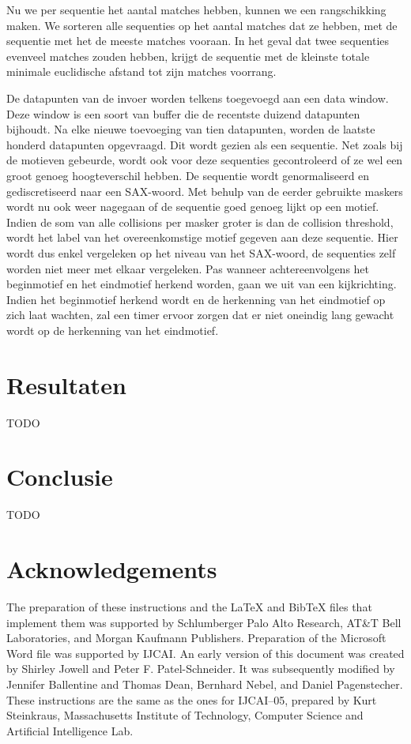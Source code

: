 \documentclass{article}
\begin{document}
Nu we per sequentie het aantal matches hebben, kunnen we een rangschikking maken. We sorteren alle sequenties op het aantal matches dat ze hebben, met de sequentie met het de meeste matches vooraan. In het geval dat twee sequenties evenveel matches zouden hebben, krijgt de sequentie met de kleinste totale minimale euclidische afstand tot zijn matches voorrang.

De datapunten van de invoer worden telkens toegevoegd aan een data window. Deze window is een soort van buffer die de recentste duizend datapunten bijhoudt. Na elke nieuwe toevoeging van tien datapunten, worden de laatste honderd datapunten opgevraagd. Dit wordt gezien als een sequentie. Net zoals bij de motieven gebeurde, wordt ook voor deze sequenties gecontroleerd of ze wel een groot genoeg hoogteverschil hebben. De sequentie wordt genormaliseerd en gediscretiseerd naar een SAX-woord. Met behulp van de eerder gebruikte maskers wordt nu ook weer nagegaan of de sequentie goed genoeg lijkt op een motief. Indien de som van alle collisions per masker groter is dan de collision threshold, wordt het label van het overeenkomstige motief gegeven aan deze sequentie. Hier wordt dus enkel vergeleken op het niveau van het SAX-woord, de sequenties zelf worden niet meer met elkaar vergeleken. Pas wanneer achtereenvolgens het beginmotief en het eindmotief herkend worden, gaan we uit van een kijkrichting. Indien het beginmotief herkend wordt en de herkenning van het eindmotief op zich laat wachten, zal een timer ervoor zorgen dat er niet oneindig lang gewacht wordt op de herkenning van het eindmotief.


\section{Resultaten}
TODO

\section{Conclusie}
TODO

\section*{Acknowledgements}

The preparation of these instructions and the \LaTeX{} and Bib\TeX{}
files that implement them was supported by Schlumberger Palo Alto
Research, AT\&T Bell Laboratories, and Morgan Kaufmann Publishers.
Preparation of the Microsoft Word file was supported by IJCAI.  An
early version of this document was created by Shirley Jowell and Peter
F. Patel-Schneider.  It was subsequently modified by Jennifer
Ballentine and Thomas Dean, Bernhard Nebel, and Daniel Pagenstecher.
These instructions are the same as the ones for IJCAI--05, prepared by
Kurt Steinkraus, Massachusetts Institute of Technology, Computer
Science and Artificial Intelligence Lab.
\end{document}
